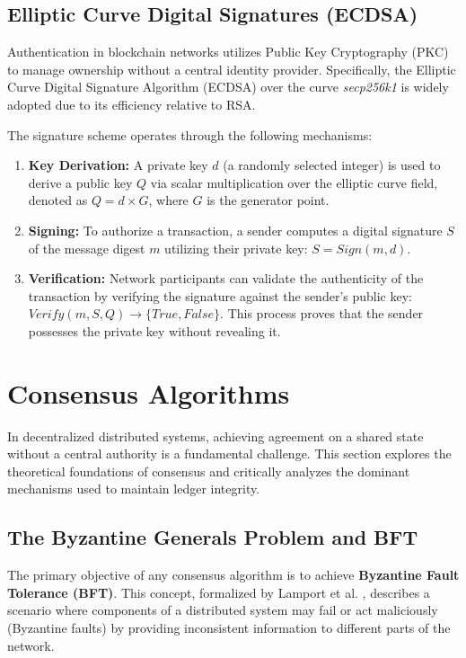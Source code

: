 \subsection{Elliptic Curve Digital Signatures (ECDSA)}
Authentication in blockchain networks utilizes Public Key Cryptography (PKC) to manage ownership without a central identity provider. Specifically, the Elliptic Curve Digital Signature Algorithm (ECDSA) over the curve \textit{secp256k1} is widely adopted due to its efficiency relative to RSA.

The signature scheme operates through the following mechanisms:
\begin{enumerate}
    \item \textbf{Key Derivation:} A private key $d$ (a randomly selected integer) is used to derive a public key $Q$ via scalar multiplication over the elliptic curve field, denoted as $Q = d \times G$, where $G$ is the generator point.
    \item \textbf{Signing:} To authorize a transaction, a sender computes a digital signature $S$ of the message digest $m$ utilizing their private key: $S = Sign(m, d)$.
    \item \textbf{Verification:} Network participants can validate the authenticity of the transaction by verifying the signature against the sender's public key: $Verify(m, S, Q) \rightarrow \{True, False\}$. This process proves that the sender possesses the private key without revealing it.
\end{enumerate}

\section{Consensus Algorithms} \label{ch2_consensus}

In decentralized distributed systems, achieving agreement on a shared state without a central authority is a fundamental challenge. This section explores the theoretical foundations of consensus and critically analyzes the dominant mechanisms used to maintain ledger integrity.

\subsection{The Byzantine Generals Problem and BFT}
The primary objective of any consensus algorithm is to achieve \textbf{Byzantine Fault Tolerance (BFT)}. This concept, formalized by Lamport et al. \cite{lamport1982byzantine}, describes a scenario where components of a distributed system may fail or act maliciously (Byzantine faults) by providing inconsistent information to different parts of the network.

